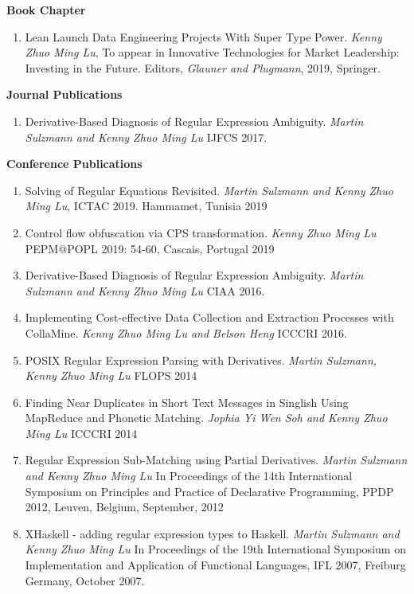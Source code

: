 \documentclass[margin,line]{res}
\begin{document}
\begin{resume}
{{\bf Book Chapter}
\begin{enumerate}
\item Lean Launch Data Engineering Projects With Super
    Type Power. \textit{Kenny Zhuo Ming Lu}, To appear in Innovative
    Technologies for Market Leadership: Investing in the
    Future. Editors, \textit{Glauner and Plugmann}, 2019, Springer.
\end{enumerate}



{\bf Journal Publications}
\begin{enumerate}
\item Derivative-Based Diagnosis of Regular Expression
  Ambiguity. \textit{Martin Sulzmann and Kenny Zhuo Ming Lu} IJFCS 2017.
\end{enumerate}


{\bf Conference Publications}
\begin{enumerate}
\item  Solving of Regular Equations Revisited. \textit{Martin Sulzmann
    and Kenny Zhuo Ming Lu}, ICTAC 2019. Hammamet, Tunisia 2019  
\item Control flow obfuscation via CPS transformation. \textit{Kenny
    Zhuo Ming Lu}  PEPM@POPL 2019: 54-60, Cascais, Portugal 2019 
\item Derivative-Based Diagnosis of Regular Expression
  Ambiguity. \textit{Martin Sulzmann and Kenny Zhuo Ming Lu} CIAA 2016.
\item Implementing Cost-effective Data Collection and Extraction
  Processes with CollaMine. \textit{Kenny Zhuo Ming Lu and Belson
    Heng} ICCCRI 2016.
\item POSIX Regular Expression Parsing with Derivatives. \textit{Martin Sulzmann, Kenny Zhuo Ming Lu}  FLOPS 2014  
\item Finding Near Duplicates in Short Text Messages in Singlish Using
  MapReduce and Phonetic Matching. \textit{ Jophia Yi Wen Soh and
    Kenny Zhuo Ming Lu} ICCCRI 2014
\item Regular Expression Sub-Matching using Partial Derivatives. \textit{Martin Sulzmann and Kenny Zhuo Ming Lu} 
In Proceedings of the 14th International Symposium on Principles and Practice of Declarative Programming, PPDP 2012, Leuven, Belgium, September, 2012
\item XHaskell - adding regular expression types to Haskell. \textit{Martin Sulzmann and Kenny Zhuo Ming Lu} 
In Proceedings of the 19th International Symposium on Implementation and Application of Functional Languages, IFL 2007, Freiburg Germany, October 2007.

\end{enumerate}}
\end{resume}
\end{document}
